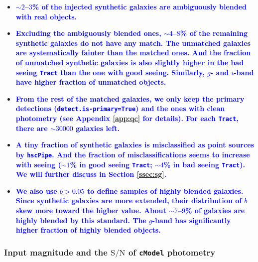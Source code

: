 \documentclass[useamsfonts]{pasj01}
\def\hscpipe{\texttt{hscPipe}}
\def\cmodel{\texttt{cModel}}
\def\tract{\texttt{Tract}}
\newcommand{\plan}[1]{\textcolor{blue} {\textbf{#1}}}
\begin{document}
    \begin{itemize}

        \item \plan{${\sim}2$--$3$\% of the injected synthetic galaxies are
            ambiguously blended with real objects.}

        \item \plan{Excluding the ambiguously blended ones, ${\sim}4$--$8$\% of the
            remaining synthetic galaxies do not have any match.
            The unmatched galaxies are systematically fainter than the matched ones.
            And the fraction of unmatched synthetic galaxies is also slightly higher
            in the bad seeing \tract{} than the one with good seeing.
            Similarly, $g$- and $i$-band have higher fraction of unmatched objects.
            }

       \item \plan{From the rest of the matched galaxies, we only keep the primary
           detections (\texttt{detect.is-primary=True}) and the ones with clean
           photometry (see Appendix \ref{app:qc} for details).
           For each \tract{}, there are ${\sim}30000$ galaxies left.}

       \item \plan{A tiny fraction of synthetic galaxies is misclassified as
           point sources by \hscpipe{}.
           And the fraction of misclassifications seems to increase with seeing
           (${\sim}1$\% in good seeing \tract{}; ${\sim}4$\% in bad seeing \tract{}).
           We will further discuss in Section \ref{ssec:sg}.}

       \item \plan{We also use $b>0.05$ to define samples of highly blended galaxies.
           Since synthetic galaxies are more extended, their distribution of $b$
           skew more toward the higher value.
           About ${\sim}7$--$9$\% of galaxies are highly blended by this standard.
           The $g$-band has significantly higher fraction of highly blended objects.}

    \end{itemize}

\subsubsection{Input magnitude and the $\mathrm{S}/\mathrm{N}$ of \cmodel{} photometry}
\end{document}
